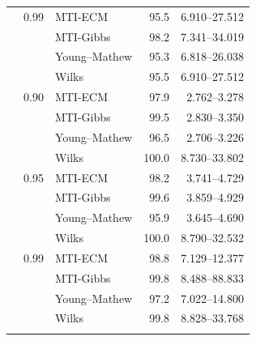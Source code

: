\begin{longtable}{@{}rrlrr@{}}
\addlinespace[0.3em]
500 & 0.99 & MTI-ECM & 95.5 & 6.910--27.512 \\
 &  & MTI-Gibbs & 98.2 & 7.341--34.019 \\
 &  & Young--Mathew & 95.3 & 6.818--26.038 \\
 &  & Wilks & 95.5 & 6.910--27.512 \\
\addlinespace[0.3em]
1000 & 0.90 & MTI-ECM & 97.9 & 2.762--3.278 \\
 &  & MTI-Gibbs & 99.5 & 2.830--3.350 \\
 &  & Young--Mathew & 96.5 & 2.706--3.226 \\
 &  & Wilks & 100.0 & 8.730--33.802 \\
\addlinespace[0.3em]
1000 & 0.95 & MTI-ECM & 98.2 & 3.741--4.729 \\
 &  & MTI-Gibbs & 99.6 & 3.859--4.929 \\
 &  & Young--Mathew & 95.9 & 3.645--4.690 \\
 &  & Wilks & 100.0 & 8.790--32.532 \\
\addlinespace[0.3em]
1000 & 0.99 & MTI-ECM & 98.8 & 7.129--12.377 \\
 &  & MTI-Gibbs & 99.8 & 8.488--88.833 \\
 &  & Young--Mathew & 97.2 & 7.022--14.800 \\
 &  & Wilks & 99.8 & 8.828--33.768 \\
\addlinespace[0.3em]
\end{longtable}
\clearpage
